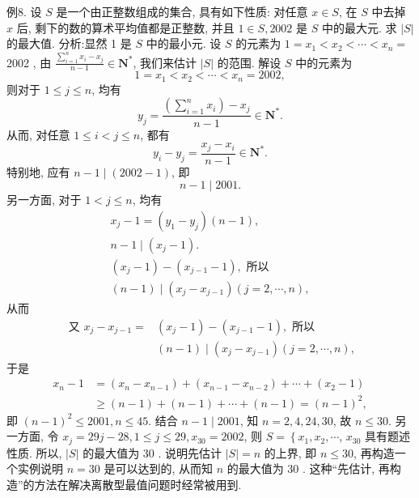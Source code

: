 例8. 设 $S$ 是一个由正整数组成的集合, 具有如下性质: 对任意 $x \in S$, 在 $S$ 中去掉 $x$ 后, 剩下的数的算术平均值都是正整数, 并且 $1 \in S, 2002$ 是 $S$ 中的最大元.
求 $|S|$ 的最大值.
分析:显然 1 是 $S$ 中的最小元.
设 $S$ 的元素为 $1=x_1<x_2<\cdots<x_n=$ 2002 , 由 $\frac{\sum_{i=1}^n x_i-x_j}{n-1} \in \mathbf{N}^*$, 我们来估计 $|S|$ 的范围.
解设 $S$ 中的元素为
$$
1=x_1<x_2<\cdots<x_n=2002,
$$
则对于 $1 \leqslant j \leqslant n$, 均有
$$
y_j=\frac{\left(\sum_{i=1}^n x_i\right)-x_j}{n-1} \in \mathbf{N}^* .
$$
从而, 对任意 $1 \leqslant i<j \leqslant n$, 都有
$$
y_i-y_j=\frac{x_j-x_i}{n-1} \in \mathbf{N}^* .
$$
特别地, 应有 $n-1 \mid(2002-1)$, 即
$$
n-1 \mid 2001 .
$$
另一方面, 对于 $1<j \leqslant n$, 均有
$$
\begin{gathered}
x_j-1=\left(y_1-y_j\right)(n-1), \\
n-1 \mid\left(x_j-1\right) . \\
\left(x_j-1\right)-\left(x_{j-1}-1\right), \text { 所以 } \\
(n-1) \mid\left(x_j-x_{j-1}\right)(j=2, \cdots, n),
\end{gathered}
$$
从而
$$
\begin{aligned}
\text { 又 } x_j-x_{j-1}= & \left(x_j-1\right)-\left(x_{j-1}-1\right), \text { 所以 } \\
& (n-1) \mid\left(x_j-x_{j-1}\right)(j=2, \cdots, n),
\end{aligned}
$$
于是
$$
\begin{aligned}
x_n-1 & =\left(x_n-x_{n-1}\right)+\left(x_{n-1}-x_{n-2}\right)+\cdots+\left(x_2-1\right) \\
& \geqslant(n-1)+(n-1)+\cdots+(n-1)=(n-1)^2,
\end{aligned}
$$
即 $(n-1)^2 \leqslant 2001, n \leqslant 45$. 结合 $n-1 \mid 2001$, 知 $n=2,4,24,30$, 故 $n \leqslant 30$.
另一方面, 令 $x_j=29 j-28,1 \leqslant j \leqslant 29, x_{30}=2002$, 则 $S=\left\{x_1, x_2, \cdots\right.$, $x_{30}$ 具有题述性质.
所以, $|S|$ 的最大值为 30 .
说明先估计 $|S|=n$ 的上界, 即 $n \leqslant 30$, 再构造一个实例说明 $n=30$ 是可以达到的, 从而知 $n$ 的最大值为 30 . 这种“先估计, 再构造”的方法在解决离散型最值问题时经常被用到.



